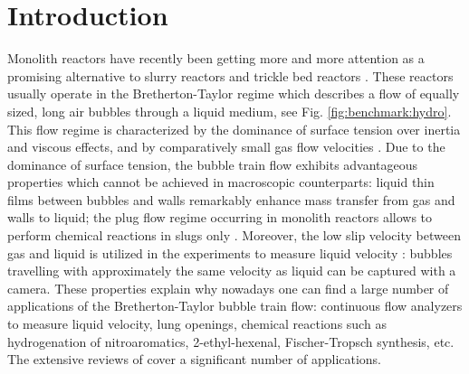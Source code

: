 \documentclass{article}
\begin{document}
\section{Introduction}
\label{intro}
Monolith reactors have recently been getting more and more attention as a promising alternative to slurry
reactors and trickle bed reactors \cite{kreutzer-overview,bercic-mass}.  These reactors usually operate in
 the Bretherton-Taylor regime \cite{bretherton,taylor} which describes a flow
 of equally sized, long air bubbles through a liquid medium, see
Fig. \ref{fig:benchmark:hydro}. This flow regime
is characterized by the dominance of surface tension over inertia and viscous effects, and by
comparatively small gas flow velocities \cite{yue-mass}. Due to the dominance of surface tension, the bubble train flow exhibits advantageous
 properties which cannot be achieved
in macroscopic counterparts: liquid thin films \cite{bretherton} between bubbles and walls remarkably enhance mass
transfer from gas and walls to liquid; the plug flow regime occurring in monolith reactors allows to perform chemical reactions in slugs only \cite{kreutzer-overview}.
 Moreover, the low slip velocity between gas and liquid is utilized in the experiments to measure liquid velocity \cite{taylor}:  bubbles
 travelling with approximately the same velocity as liquid can be captured with a camera. These properties explain why nowadays one can find a large number of applications
of the Bretherton-Taylor bubble train flow: continuous flow analyzers to measure liquid velocity, lung openings, chemical reactions
such as hydrogenation of nitroaromatics, 2-ethyl-hexenal, Fischer-Tropsch synthesis, etc. The extensive reviews of \citet{kreutzer-overview,
gupta-review,yue-mass} cover a significant number of applications.
\end{document}
